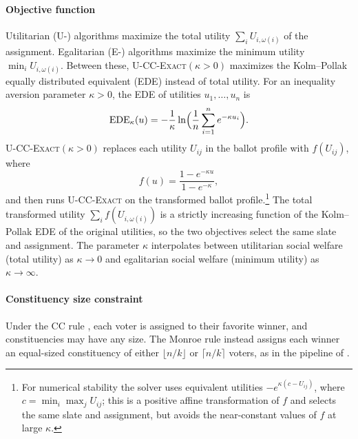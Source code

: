 \documentclass[letterpaper]{article} %
\newcommand{\Exact}{\textsc{U-CC-Exact}}
\newcommand{\ExactP}{\textsc{U-CC-Exact}$(\kappa>0)$}
\begin{document}
\paragraph{Objective function}
Utilitarian (U-) algorithms maximize the total utility \(\sum_i U_{i,\omega(i)}\) of the assignment.
Egalitarian (E-) algorithms maximize the minimum utility \(\min_i U_{i,\omega(i)}\).
Between these, \ExactP{} maximizes the Kolm--Pollak equally distributed equivalent (EDE) \citep{kolm-1976, pollak-1971} instead of total utility.
For an inequality aversion parameter \(\kappa>0\), the EDE of utilities \(u_1,\dots,u_n\) is
\[
\mathrm{EDE}_\kappa(u)=-\frac{1}{\kappa}\ln\Bigl(\frac{1}{n}\sum_{i=1}^n e^{-\kappa u_i}\Bigr).
\]
\ExactP{} replaces each utility \(U_{ij}\) in the ballot profile with \(f(U_{ij})\), where
\[
f(u)=\frac{1-e^{-\kappa u}}{1-e^{-\kappa}},
\]
and then runs \Exact{} on the transformed ballot profile.\footnote{For numerical stability the solver uses equivalent utilities \(-e^{\kappa(c-U_{ij})}\), where \(c=\min_i\max_j U_{ij}\); this is a positive affine transformation of \(f\) and selects the same slate and assignment, but avoids the near-constant values of \(f\) at large \(\kappa\).}
The total transformed utility \(\sum_i f(U_{i,\omega(i)})\) is a strictly increasing function of the Kolm--Pollak EDE of the original utilities, so the two objectives select the same slate and assignment.
The parameter \(\kappa\) interpolates between utilitarian social welfare (total utility) as \(\kappa\to0\) and egalitarian social welfare (minimum utility) as \(\kappa\to\infty\).

\paragraph{Constituency size constraint}
Under the CC rule \citep{chamberlin-courant}, each voter is assigned to their favorite winner, and constituencies may have any size.
The Monroe rule \citep{monroe-1995} instead assigns each winner an equal-sized constituency of either \(\lfloor n/k\rfloor\) or \(\lceil n/k\rceil\) voters, as in the pipeline of \citet{fish-v2}.
\end{document}
